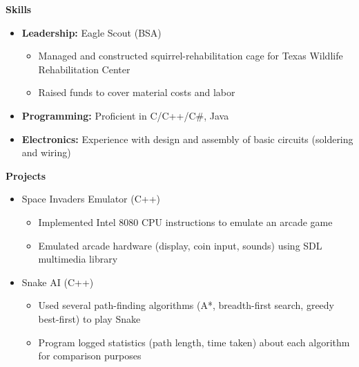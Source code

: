 \documentclass[letterpaper,11pt]{article}
\newcommand{\resheading}[1]{{\large \colorbox{mygrey}{\begin{minipage}{0.989\textwidth}{\textbf{#1 \vphantom{p\^{E}}}}\end{minipage}}}}
\begin{document}
\resheading{Skills}
\begin{itemize}
\item \textbf{Leadership:} Eagle Scout (BSA)
\begin{itemize}
\item Managed and constructed squirrel-rehabilitation cage for Texas Wildlife Rehabilitation Center
\item Raised funds to cover material costs and labor
\end{itemize}

\item \textbf{Programming:} Proficient in C/C++/C\#, Java
\item \textbf{Electronics:} Experience with design and assembly of basic circuits (soldering and wiring)
\end{itemize}


\resheading{Projects}
\begin{itemize}

\item Space Invaders Emulator (C++)
\begin{itemize}
\item Implemented Intel 8080 CPU instructions to emulate an arcade game
\item Emulated arcade hardware (display, coin input, sounds) using SDL multimedia library
 
\end{itemize}

\item Snake AI (C++)
\begin{itemize}
\item Used several path-finding algorithms (A*, breadth-first search, greedy best-first) to play Snake
\item Program logged statistics (path length, time taken) about each algorithm for comparison purposes
\end{itemize}

\end{itemize}

\pagebreak
\end{document}
